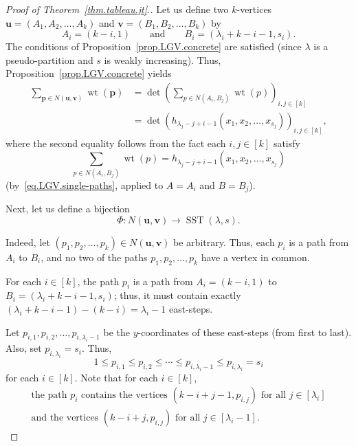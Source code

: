 \documentclass[reqno]{amsart}
\newcommand{\0}{\phantom{c}}
\DeclareMathOperator{\wt}{wt} %
\DeclareMathOperator{\SST}{SST} %
\newcommand{\pp}{\mathbf{p}}
\newcommand{\uu}{\mathbf{u}}
\newcommand{\vv}{\mathbf{v}}
\let\sumnonlimits\sum
\renewcommand{\sum}{\sumnonlimits\limits}
\newenvironment{verlong}{}{}
\newcommand{\tup}[1]{\left( #1 \right)}
\newcommand{\ive}[1]{\left[ #1 \right]}
\theoremstyle{plain}
\theoremstyle{definition}
\numberwithin{equation}{section}
\begin{document}
\begin{verlong}
\begin{proof}[Proof of Theorem~\ref{thm.tableau.jt}.]
Let us define two $k$-vertices $\uu = \tup{A_1, A_2, \dotsc, A_k}$ and $\vv = \tup{B_1, B_2, \dotsc, B_k}$ by
\[
A_i = (k-i,1)  \qquad \text{and} \qquad B_i = (\lambda_i+k-i-1, s_i).
\]
The conditions of Proposition~\ref{prop.LGV.concrete} are satisfied (since $\lambda$ is a pseudo-partition and $s$ is weakly increasing).
Thus, Proposition~\ref{prop.LGV.concrete} yields
\begin{align}
\sum_{\pp \in N(\uu,\vv)} \wt(\pp) & = \det\left(  \sum_{p \in  N(A_i,B_j)}\wt(p) \right)_{i, j \in \ive{k}} \nonumber \\
 & = \det\left( h_{\lambda_j-j+i-1}(x_1, x_2, \dotsc, x_{s_j}) \right)_{i, j \in \ive{k}},
\label{pf.thm.tableau.jt.1}
\end{align}
where the second equality follows from the fact each $i,j \in \ive{k}$ satisfy
\[
\sum_{p \in N(A_i,B_j)} \wt(p) = h_{\lambda_j-j+i-1}(x_1, x_2, \dotsc, x_{s_j})
\]
(by~\eqref{eq.LGV.single-paths}, applied to $A = A_i$ and $B = B_j$).

Next, let us define a bijection
\[
\Phi \colon N(\uu, \vv) \to \SST(\lambda, s).
\]

Indeed, let $\tup{p_1, p_2, \dotsc, p_k} \in N(\uu,\vv)$ be arbitrary.
Thus, each $p_i$ is a path from $A_i$ to $B_i$, and no two of the paths $p_1, p_2, \dotsc, p_k$ have a vertex in common.

For each $i \in \ive{k}$, the path $p_i$ is a path from $A_i = (k-i, 1)$ to $B_i = (\lambda_i+k-i-1,s_i)$; thus, it must contain exactly $(\lambda_i+k-i-1) - (k-i) = \lambda_i - 1$ east-steps.

Let $p_{i,1},p_{i,2}, \dotsc, p_{i,\lambda_i-1}$ be the $y$-coordinates of these east-steps (from first to last).
Also, set $p_{i,\lambda_i} = s_i$.
Thus,
\begin{equation}
\label{pf.thm.tableau.jt.row-weak}
1 \leq p_{i,1} \leq p_{i,2} \leq \cdots \leq p_{i,\lambda_i-1} \leq p_{i,\lambda_i} = s_i
\end{equation}
for each $i \in \ive{k}$.
Note that for each $i \in \ive{k}$,
\begin{subequations}
\begin{gather}
\label{pf.thm.tableau.jt.pi-vert-1}
\text{the path }p_i\text{ contains the vertices } (k-i+j-1, p_{i,j})  \text{ for all } j \in \ive{\lambda_i}
\\
\label{pf.thm.tableau.jt.pi-vert-2}
\text{and the vertices } (k-i+j, p_{i,j}) \text{ for all } j \in \ive{\lambda_i-1}.
\end{gather}
\end{subequations}


\end{proof}
\end{verlong}
\end{document}
